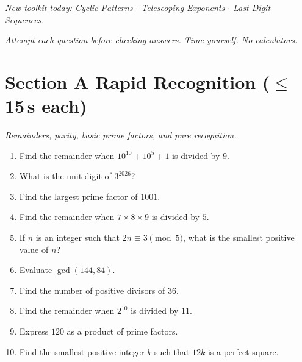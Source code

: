 \documentclass[11pt,a4paper]{article}
\begin{document}
\noindent\textit{New toolkit today: Cyclic Patterns $\cdot$ Telescoping Exponents $\cdot$ Last Digit Sequences.}

\vspace{2pt}
\noindent\textit{Attempt each question before checking answers. Time yourself. No calculators.}

\section*{Section A \quad Rapid Recognition \hfill{\normalfont\small($\leq$15\,s each)}}

\noindent\textit{Remainders, parity, basic prime factors, and pure recognition.}

\begin{enumerate}

\item Find the remainder when $10^{10} + 10^5 + 1$ is divided by $9$.

\item What is the unit digit of $3^{2026}$?

\item Find the largest prime factor of $1001$.

\item Find the remainder when $7 \times 8 \times 9$ is divided by $5$.

\item If $n$ is an integer such that $2n \equiv 3 \pmod 5$, what is the smallest positive value of $n$?

\item Evaluate $\gcd(144, 84)$.

\item Find the number of positive divisors of $36$.

\item Find the remainder when $2^{10}$ is divided by $11$.

\item Express $120$ as a product of prime factors.

\item Find the smallest positive integer $k$ such that $12k$ is a perfect square.

\end{enumerate}
\end{document}

